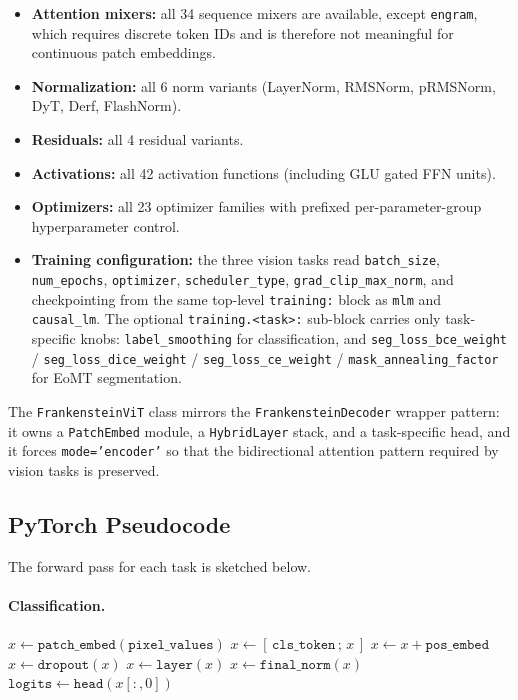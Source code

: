 \begin{itemize}[leftmargin=*]
    \item \textbf{Attention mixers:} all 34 sequence mixers are available, except \texttt{engram}, which requires discrete token IDs and is therefore not meaningful for continuous patch embeddings.
    \item \textbf{Normalization:} all 6 norm variants (LayerNorm, RMSNorm, pRMSNorm, DyT, Derf, FlashNorm).
    \item \textbf{Residuals:} all 4 residual variants.
    \item \textbf{Activations:} all 42 activation functions (including GLU gated FFN units).
    \item \textbf{Optimizers:} all 23 optimizer families with prefixed per-parameter-group hyperparameter control.
    \item \textbf{Training configuration:} the three vision tasks read \texttt{batch\_size}, \texttt{num\_epochs}, \texttt{optimizer}, \texttt{scheduler\_type}, \texttt{grad\_clip\_max\_norm}, and checkpointing from the same top-level \texttt{training:} block as \texttt{mlm} and \texttt{causal\_lm}. The optional \texttt{training.<task>:} sub-block carries only task-specific knobs: \texttt{label\_smoothing} for classification, and \texttt{seg\_loss\_bce\_weight} / \texttt{seg\_loss\_dice\_weight} / \texttt{seg\_loss\_ce\_weight} / \texttt{mask\_annealing\_factor} for EoMT segmentation.
\end{itemize}

The \texttt{FrankensteinViT} class mirrors the \texttt{FrankensteinDecoder} wrapper pattern: it owns a \texttt{PatchEmbed} module, a \texttt{HybridLayer} stack, and a task-specific head, and it forces \texttt{mode='encoder'} so that the bidirectional attention pattern required by vision tasks is preserved.

\subsection{PyTorch Pseudocode}

The forward pass for each task is sketched below.

\paragraph{Classification.}
\begin{algorithmic}[1]
\State $x \gets \texttt{patch\_embed}(\texttt{pixel\_values})$ 
\State $x \gets [\,\texttt{cls\_token}\,;\, x\,]$ 
\State $x \gets x + \texttt{pos\_embed}$ 
\State $x \gets \texttt{dropout}(x)$
    \State $x \gets \texttt{layer}(x)$
\EndFor
\State $x \gets \texttt{final\_norm}(x)$
\State $\texttt{logits} \gets \texttt{head}(x[:, 0])$ 
\end{algorithmic}

